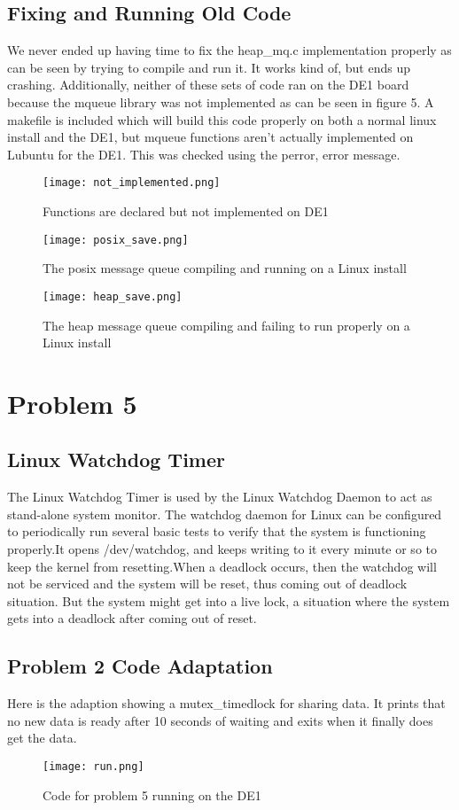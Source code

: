 \documentclass{article}
\begin{document}
\subsection*{Fixing and Running Old Code}
We never ended up having time to fix the heap\_mq.c implementation properly as can be seen by trying to compile and run it. It works kind of, but ends up crashing. Additionally, neither of these sets of code ran on the DE1 board because the mqueue library was not implemented as can be seen in figure 5. A makefile is included which will build this code properly on both a normal linux install and the DE1, but mqueue functions aren't actually implemented on Lubuntu for the DE1. This was checked using the perror, error message.

\begin{figure}[H]
    \centering
    \texttt{[image: not\_implemented.png]}
    \caption{Functions are declared but not implemented on DE1}
\end{figure}
\begin{figure}[H]
    \centering
    \texttt{[image: posix\_save.png]}
    \caption{The posix message queue compiling and running on a Linux install}
\end{figure}
\begin{figure}[H]
    \centering
    \texttt{[image: heap\_save.png]}
    \caption{The heap message queue compiling and failing to run properly on a Linux install}
\end{figure}
\section*{Problem 5}
\subsection*{Linux Watchdog Timer}
The Linux Watchdog Timer is used by the Linux Watchdog Daemon to act as stand-alone system monitor. The watchdog daemon for Linux can be configured to periodically run  several basic tests to verify that the system is functioning properly.It opens /dev/watchdog, and keeps writing to it every minute or so to keep the kernel from resetting.When a deadlock occurs, then the watchdog will not be serviced and the system will be reset, thus coming out of deadlock situation. But the system might get into a live lock, a situation where the system gets into a deadlock after coming out of reset.
\subsection*{Problem 2 Code Adaptation}
Here is the adaption showing a mutex\_timedlock for sharing data. It prints that no new data is ready after 10 seconds of waiting and exits when it finally does get the data.
\begin{figure}[H]
    \centering
    \texttt{[image: run.png]}
    \caption{Code for problem 5 running on the DE1}
\end{figure}
\end{document}
